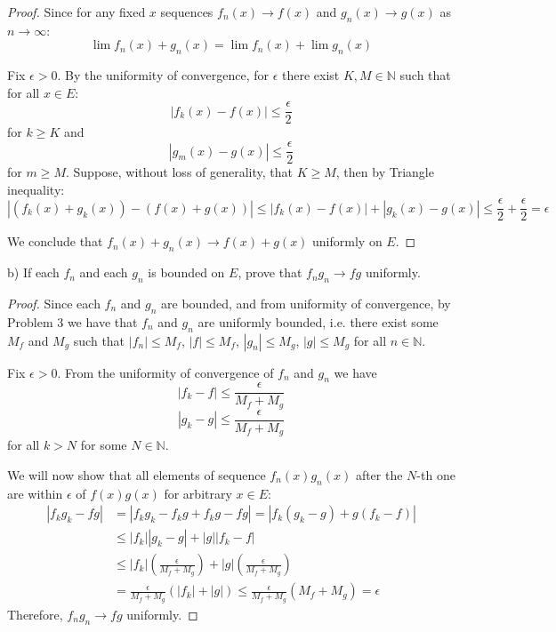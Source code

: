 \documentclass{article}
\begin{document}
\begin{proof}

Since for any fixed $x$ sequences $f_n(x) \to f(x)$ and $g_n(x) \to g(x)$ as $n \to \infty$:
\[ \lim f_n(x) + g_n(x) = \lim f_n(x) + \lim g_n(x) \]

Fix $\epsilon>0$.
By the uniformity of convergence, for $\epsilon$ there exist $K, M \in \mathbb{N}$ such that for all $x \in E$:
\[ | f_k(x) - f(x) | \leq \frac{\epsilon}{2} \]
for $k \geq K$ and
\[ | g_m(x) - g(x) | \leq \frac{\epsilon}{2} \]
for $m \geq M$. 
Suppose, without loss of generality, that $K \geq M$, then by Triangle inequality:
\[ | (f_k(x) + g_k(x)) - (f(x) + g(x)) | \leq |f_k(x)-f(x)| + |g_k(x)-g(x)| \leq \frac{\epsilon}{2} + \frac{\epsilon}{2} = \epsilon \]

We conclude that $f_n(x) + g_n(x) \to f(x)+g(x)$ uniformly on $E$.

\end{proof}

\begin{tcolorbox}
b) If each $f_n$ and each $g_n$ is bounded on $E$, prove that $f_n g_n \to f g$ uniformly.
\end{tcolorbox}

\begin{proof}

Since each $f_n$ and $g_n$ are bounded, and from uniformity of convergence, by Problem 3 we have that $f_n$ and $g_n$ are uniformly bounded, i.e. there exist some $M_f$ and $M_g$ such that $|f_n| \leq M_f$, $|f| \leq M_f$, $|g_n| \leq M_g$, $|g| \leq M_g$ for all $n \in \mathbb{N}$.

Fix $\epsilon>0$. From the uniformity of convergence of $f_n$ and $g_n$ we have
\[ |f_k - f| \leq \frac{\epsilon}{M_f + M_g} \]
\[ |g_k - g| \leq \frac{\epsilon}{M_f + M_g} \]
for all $k > N$ for some $N \in \mathbb{N}$.

We will now show that all elements of sequence $f_n(x) g_n(x)$ after the $N$-th one are within $\epsilon$ of $f(x)g(x)$ for arbitrary $x \in E$:
\begin{equation*}
\begin{split}
    |f_k g_k - fg| & = |f_k g_k - f_k g + f_k g - fg| = |f_k(g_k-g) + g(f_k-f)| \\
    & \leq |f_k| |g_k-g| + |g| |f_k-f| \\
    & \leq |f_k| \left( \frac{\epsilon}{M_f + M_g} \right) + |g| \left( \frac{\epsilon}{M_f + M_g} \right) \\
    & = \frac{\epsilon}{M_f + M_g} (|f_k|+|g|) \leq \frac{\epsilon}{M_f + M_g} (M_f+M_g) = \epsilon
\end{split}
\end{equation*}
Therefore, $f_n g_n \to fg$ uniformly.

\end{proof}
\end{document}
